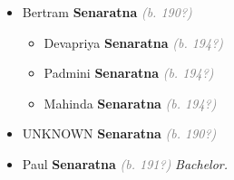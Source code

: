 \documentclass[10pt, openany]{book}
\begin{document}
\begin{itemize}
{\begin{itemize}
{\begin{itemize}
{\begin{itemize}
{\begin{itemize}
{\begin{itemize}
\item{Manjula \textbf{Illangaratna} \textcolor{gray}{\textit{(b. 199?)}}
 }
\end{itemize}}
\end{itemize}
 }
\item{Kamala \textbf{Senaratna} \textcolor{gray}{\textit{(b. 195?)}} \textcolor{slmaroon}{\textit{Died Young.}}
 }
\end{itemize}}
\end{itemize}
 }
\item{Bertram \textbf{Senaratna} \textcolor{gray}{\textit{(b. 190?)}}
\begin{itemize}
\item{Devapriya \textbf{Senaratna} \textcolor{gray}{\textit{(b. 194?)}}
 }
\item{Padmini \textbf{Senaratna} \textcolor{gray}{\textit{(b. 194?)}}
 }
\item{Mahinda \textbf{Senaratna} \textcolor{gray}{\textit{(b. 194?)}}
 }
\end{itemize}
 }
\item{UNKNOWN \textbf{Senaratna} \textcolor{gray}{\textit{(b. 190?)}}
 }
\item{Paul \textbf{Senaratna} \textcolor{gray}{\textit{(b. 191?)}} \textcolor{slmaroon}{\textit{Bachelor.}}
 }
\end{itemize}}
\end{itemize}
  
\end{document}
